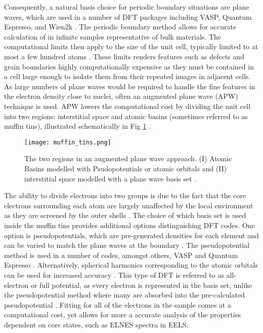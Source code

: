 Consequently, a natural basis choice for periodic boundary situations are plane waves, which are used in a number of DFT packages including VASP, Quantum Espresso, and Wien2k \cite{qe,vasp,wien2k}.  The periodic boundary method allows for accurate calculation of in infinite samples representative of bulk materials.  The computational limits then apply to the size of the unit cell, typically limited to at most a few hundred atoms \cite{mohr_linear_2018}.  These limits renders features such as defects and grain boundaries highly computationally expensive as they must be contained in a cell large enough to isolate them from their repeated images in adjacent cells. 
As large numbers of plane waves would be required to handle the fine features in the electron density close to nuclei, often an augmented plane wave (APW) technique is used.  APW lowers the computational cost by dividing the unit cell into two regions: interstitial space and atomic basins (sometimes referred to as muffin tins), illustrated schematically  in Fig \ref{MT} \cite{wien2k}. 
\begin{figure}
	\centering
	\texttt{[image: muffin\_tins.png]}
	\caption{The two regions in an augmented plane wave approach.  (I) Atomic Basins modelled with Psudopotentials or atomic orbitals and (II) interstitial space modelled with a plane wave basis set \cite{wien2k}. }
	\label{MT}   
\end{figure}

The ability to divide electrons into two groups is due to the fact that the core electrons surrounding each atom are largely unaffected by the local environment as they are screened by the outer shells \cite{wien2k}. The choice of which basis set is used inside the muffin tins provides additional options distinguishing DFT codes.  One option is pseudopotentials, which are pre-generated densities for each element and can be varied to match the plane waves at the boundary \cite{singh_planewaves_2006}.  The pseudopotential method is used in a number of codes, amongst others, VASP and Quantum Espresso \cite{vasp,qe}.  Alternatively, spherical harmonics corresponding to the atomic orbitals can be used for increased accuracy \cite{griffiths}. This type of DFT is referred to as all-electron or full potential, as every electron is represented in the basis set, unlike the pseudopotential method where many are absorbed into the pre-calculated pseudopotential \cite{wien2k}. Fitting for all of the electrons in the sample comes at a computational cost, yet allows for more a accurate analysis of the properties dependent on core states, such as ELNES spectra in EELS.   
 
